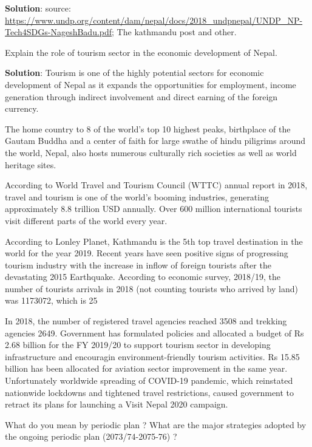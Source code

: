 \documentclass[
]{book}
\newcommand{\question}{\item}
\newenvironment{solution}{ {\bfseries Solution}:}{}
\begin{document}
\begin{questions}
\begin{solution}
source: \url{https://www.undp.org/content/dam/nepal/docs/2018_undpnepal/UNDP_NP-Tech4SDGs-NageshBadu.pdf}; The kathmandu post and other.
\end{solution}

\question Explain the role of tourism sector in the economic development of Nepal.

\begin{solution}
Tourism is one of the highly potential sectors for economic development of Nepal as it expands the opportunities for employment, income generation through indirect involvement and direct earning of the foreign currency.

The home country to 8 of the world's top 10 highest peaks, birthplace of the Gautam Buddha and a center of faith for large swathe of hindu piligrims around the world, Nepal, also hosts numerous culturally rich societies as well as world heritage sites.

According to World Travel and Tourism Council (WTTC) annual report in 2018, travel and tourism is one of the world's booming industries, generating approximately 8.8 trillion USD annually. Over 600 million international tourists visit different parts of the world every year.

According to Lonley Planet, Kathmandu is the 5th top travel destination in the world for the year 2019. Recent years have seen positive signs of progressing tourism industry with the increase in inflow of foreign tourists after the devastating 2015 Earthquake. According to economic survey, 2018/19, the number of tourists arrivals in 2018 (not counting tourists who arrived by land) was 1173072, which is 25%

In 2018, the number of registered travel agencies reached 3508 and trekking agencies 2649. Government has formulated policies and allocated a budget of Rs 2.68 billion for the FY 2019/20 to support tourism sector in developing infrastructure and encouragin environment-friendly tourism activities. Rs 15.85 billion has been allocated for aviation sector improvement in the same year. Unfortunately worldwide spreading of COVID-19 pandemic, which reinstated nationwide lockdowns and tightened travel restrictions, caused government to retract its plans for launching a Visit Nepal 2020 campaign.

\end{solution}

\question What do you mean by periodic plan ? What are the major strategies adopted by the ongoing periodic plan (2073/74-2075-76) ?


\end{questions}
\end{document}
